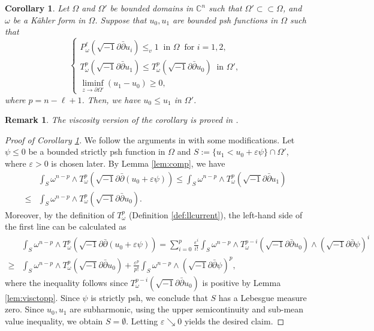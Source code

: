 \documentclass[10pt,a4paper]{amsart}
\numberwithin{equation}{section}
\newtheorem{cor}[equation]{Corollary}
\newtheorem{remark}[equation]{Remark}
\newcommand{\delb}{\sqrt{-1}\partial\bar{\partial}}
\begin{document}
\begin{cor}\label{cor:comp}
    Let $\Omega$ and $\Omega'$ be bounded domains in $\mathbb{C}^n$ such that $\Omega'\subset\subset\Omega$, and $\omega$ be a Kähler form in $\Omega$. Suppose that $u_0,u_1$ are bounded psh functions in $\Omega$ such that 
    \begin{equation*}
        \begin{cases}
            P^{\ell}_\omega(\delb u_i)\le_v1 \ \text{ in }\Omega \ \text{ for } i=1,2,\\
            T^p_\omega(\delb u_1)\le T^p_\omega(\delb u_0) \ \text{ in }\Omega',\\
            \liminf_{z\to\partial\Omega'} (u_1-u_0)\ge 0,
        \end{cases}
    \end{equation*}
    where $p=n-\ell+1$. Then, we have $u_0\le u_1$ in $\Omega'$.
\end{cor}

\begin{remark}
    The viscosity version of the corollary is proved in \cite[Theorem 22]{DDT}.
\end{remark}

\begin{proof}[Proof of Corollary \ref{cor:comp}]
    We follow the arguments in \cite[Corollary 4.4]{BT} with some modifications. Let $\psi\le0$ be a bounded strictly psh function in $\Omega$ and $S:=\{u_1<u_0+\varepsilon\psi\}\cap\Omega'$, where $\varepsilon>0$ is chosen later. By Lemma \ref{lem:comp}, we have
    \begin{equation*}
        \begin{aligned}
            &\int_S \omega^{n-p}\wedge T^p_\omega(\delb (u_0+\varepsilon\psi))\le\int_S \omega^{n-p}\wedge T^p_\omega(\delb u_1)\\
            \le&\int_{S}\omega^{n-p}\wedge T^p_\omega(\delb u_0).      
        \end{aligned}
    \end{equation*}
    Moreover, by the definition of $T^p_\omega$ (Definition \ref{def:llcurrent}), the left-hand side of the first line can be calculated as
    \begin{align*}
        &\int_S \omega^{n-p}\wedge T^p_\omega(\delb (u_0+\varepsilon\psi))=\sum_{i=0}^p\frac{\varepsilon^i}{i!}\int_S \omega^{n-p}\wedge T^{p-i}_\omega(\delb u_0)\wedge(\delb\psi)^i\\
        \ge&\int_S \omega^{n-p}\wedge T^p_\omega(\delb u_0)+\frac{\varepsilon^p}{p!}\int_S\omega^{n-p}\wedge(\delb \psi)^p,
    \end{align*}
    where the inequality follows since $T^{p-i}_\omega(\delb u_0)$ is positive by Lemma \ref{lem:visctopp}. Since $\psi$ is strictly psh, we conclude that $S$ has a Lebesgue measure zero. Since $u_0,u_1$ are subharmonic, using the upper semicontinuity and sub-mean value inequality, we obtain $S=\emptyset$. Letting $\varepsilon\searrow0$ yields the desired claim.
\end{proof}
\end{document}

